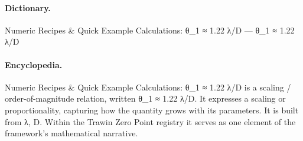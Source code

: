 \paragraph{Dictionary.}
Numeric Recipes \& Quick Example Calculations: θ\_1 ≈ 1.22 λ/D — θ\_1 ≈ 1.22 λ/D

\paragraph{Encyclopedia.}
Numeric Recipes \& Quick Example Calculations: θ\_1 ≈ 1.22 λ/D is a scaling / order-of-magnitude relation, written θ\_1 ≈ 1.22 λ/D. It expresses a scaling or proportionality, capturing how the quantity grows with its parameters. It is built from λ, D. Within the Trawin Zero Point registry it serves as one element of the framework's mathematical narrative.
